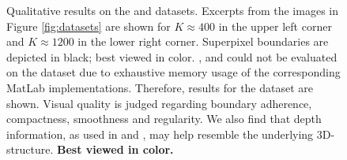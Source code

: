 \begin{figure}
	\begin{subfigure}[b]{0.02\textwidth}
		\hphantom{aa}
	\end{subfigure}
	\begin{subfigure}[b]{0.1375\textwidth}
		\hphantom{aaaaaaaaaaaaaaaaaaaaaaaaaaaaii}
	\end{subfigure}
	\begin{subfigure}[b]{0.129\textwidth}
		\hphantom{aaaaaaaaaaaaaaaaaaaaaaaaaaa}
	\end{subfigure}
	\caption{Qualitative results on the \NYU and \SUNRGBD datasets. Excerpts from the images
	in Figure \ref{fig:datasets} are shown for $K \approx 400$ in the upper left corner
	and $K \approx 1200$ in the lower right corner. Superpixel boundaries are depicted in black; best viewed in color.
	\NC, \RW and \SEAW could not be evaluated on the \SUNRGBD dataset due
	to exhaustive memory usage of the corresponding MatLab implementations.
	Therefore, results for the \NYU dataset are shown.
    Visual quality is judged regarding boundary adherence, compactness,
	smoothness and regularity. We also find
	that depth information, as used in \DASP and \VCCS, may help resemble the underlying 3D-structure.
	\textbf{Best viewed in color.}}
	\label{fig:experiments-qualitative-nyuv2-sunrgbd}
\end{figure}
